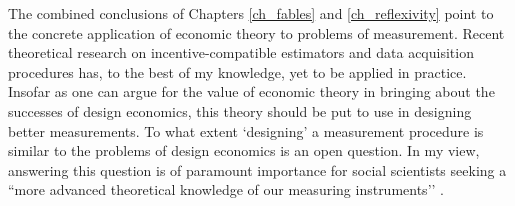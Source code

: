 The combined conclusions of Chapters \ref{ch_fables} and \ref{ch_reflexivity} point to the concrete application of economic theory to problems of measurement. Recent theoretical research on incentive-compatible estimators \autocite{caragiannis2016} and data acquisition procedures \autocite{bates2022, roth2012surveys} has, to the best of my knowledge, yet to be applied in practice. Insofar as one can argue for the value of economic theory in bringing about the successes of design economics, this theory should be put to use in designing better measurements. To what extent `designing' a measurement procedure is similar to the problems of design economics is an open question. In my view, answering this question is of paramount importance for social scientists seeking a  ``more advanced theoretical knowledge of our measuring instruments’’ \autocite[1231]{achen1975}.